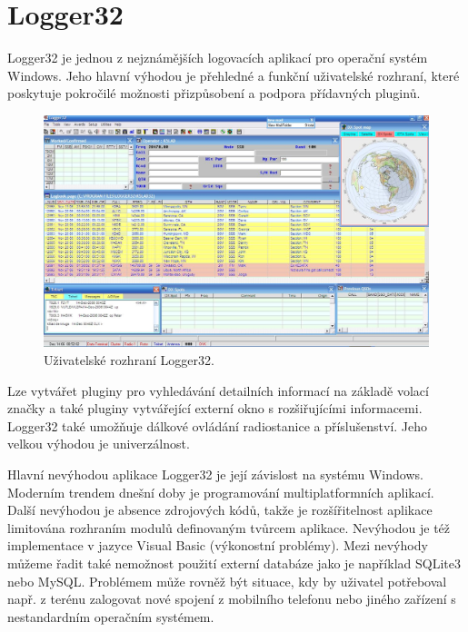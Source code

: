 \section{Logger32}%

Logger32 je jednou z nejznámějších logovacích aplikací pro operační systém Windows. Jeho hlavní výhodou je přehledné a funkční
uživatelské rozhraní, které poskytuje pokročilé možnosti přizpůsobení a podpora přídavných pluginů.

\begin{figure}[h]
\centering
\includegraphics[trim=0cm 0cm 0cm 0cm, scale=0.33]{fig/logger32}
\caption{Uživatelské rozhraní Logger32.}
\label{fig:FigureExample}
\end{figure}

Lze vytvářet pluginy pro vyhledávání detailních informací na základě volací značky a také pluginy vytvářející externí okno
s rozšiřujícími informacemi. Logger32 také umožňuje dálkové ovládání
radiostanice a příslušenství. Jeho velkou výhodou je univerzálnost.

Hlavní nevýhodou aplikace Logger32 je její závislost na systému Windows. Moderním trendem dnešní doby je programování multiplatformních
aplikací. Další nevýhodou je absence zdrojových kódů, takže je rozšířitelnost aplikace limitována rozhraním modulů definovaným
tvůrcem aplikace. Nevýhodou je též implementace v jazyce Visual Basic
(výkonostní problémy).
Mezi nevýhody můžeme řadit také nemožnost použití externí databáze jako je například SQLite3 nebo MySQL. Problémem může rovněž být
situace, kdy by uživatel potřeboval např. z terénu 
zalogovat %
nové spojení z mobilního telefonu nebo jiného zařízení s nestandardním operačním systémem.

